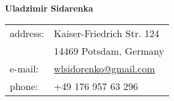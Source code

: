 \documentclass{article}
\newcommand{\cvheader}[1]{\vspace{0.5cm}
  {\raggedright \Large \sc #1}\\\rule[1em]{\textwidth}{0.1mm}}
\begin{document}
\begin{center}
  {\Large \bfseries \sc Uladzimir Sidarenka}
\end{center}
\vspace{0.5cm}

\begin{minipage}[t]{0.4\textwidth}
  \begin{flushleft}
  \end{flushleft}
\end{minipage}
\begin{minipage}[t]{0.4\textwidth}
  \begin{flushright}
    \begin{tabular}{ll}
      address: & Kaiser-Friedrich Str. 124\\
      & 14469 Potsdam, Germany\\
      e-mail: & \href{mailto:wlsidorenko@gmail.com}{wlsidorenko@gmail.com}\\
      phone: & +49 176 957 63 296\\
    \end{tabular}
  \end{flushright}
\end{minipage}


\end{document}
